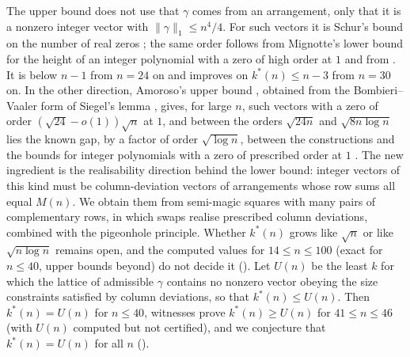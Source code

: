 The upper bound does not use that $\gamma$ comes from an arrangement, only that it is a nonzero integer vector with $\|\gamma\|_1\le n^4/4$.
For such vectors it is Schur's bound on the number of real zeros \cite{schur1933,erdosturan1950}; the same order follows from Mignotte's lower bound for the height of an integer polynomial with a zero of high order at $1$ \cite{mignotte1982,amoroso1995} and from \cite[Thm.~2.1]{BEK1999}.
It is below $n-1$ from $n=24$ on and improves on $k^*(n)\le n-3$ from $n=30$ on.
In the other direction, Amoroso's upper bound \cite[Thm.~2]{amoroso1995}, obtained from the Bombieri--Vaaler form of Siegel's lemma \cite{bombieri1987low}, gives, for large $n$, such vectors with a zero of order $(\sqrt{24}-o(1))\sqrt n$ at $1$, and between the orders $\sqrt{24n}$ and $\sqrt{8n\log n}$ lies the known gap, by a factor of order $\sqrt{\log n}$, between the constructions and the bounds for integer polynomials with a zero of prescribed order at $1$ \cite{mignotte1982,bombieri1987low,amoroso1995,BEK1999}.
The new ingredient is the realisability direction behind the lower bound: integer vectors of this kind must be column-deviation vectors of arrangements whose row sums all equal $M(n)$.
We obtain them from semi-magic squares with many pairs of complementary rows, in which swaps realise prescribed column deviations, combined with the pigeonhole principle.
Whether $k^*(n)$ grows like $\sqrt n$ or like $\sqrt{n\log n}$ remains open, and the computed values for $14\le n\le100$ (exact for $n\le40$, upper bounds beyond) do not decide it ().
Let $U(n)$ be the least $k$ for which the lattice of admissible $\gamma$ contains no nonzero vector obeying the size constraints satisfied by column deviations, so that $k^*(n)\le U(n)$.  Then $k^*(n)=U(n)$ for $n\le40$, witnesses prove $k^*(n)\ge U(n)$ for $41\le n\le46$ (with $U(n)$ computed but not certified), and we conjecture that $k^*(n)=U(n)$ for all $n$ ().

